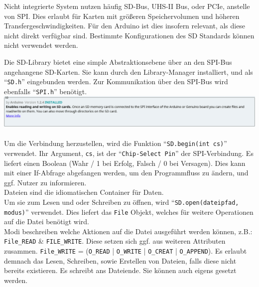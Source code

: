 \documentclass[ngerman]{handout}
\begin{document}
\begin{multicols*}{2}
    Nicht integrierte System nutzen häufig SD-Bus, UHS-II Bus, oder PCIe, anstelle von SPI.
    Dies erlaubt für Karten mit größeren Speichervolumen und höheren Transfergeschwindigkeiten.
    Für den Arduino ist dies insofern relevant, als diese nicht direkt verfügbar sind.
    Bestimmte Konfigurationen des SD Standards können nicht verwendet werden\cite{sd-spec_physical-layer}.

    Die SD-Library bietet eine simple Abstraktionsebene über an den SPI-Bus angehangene SD-Karten.
    Sie kann durch den Library-Manager installiert, und als \enquote{\texttt{SD.h}} eingebunden werden.
    Zur Kommunikation über den SPI-Bus wird ebenfalls \enquote{\texttt{SPI.h}} benötigt.\\

    \includegraphics[width=\linewidth]{media/sd-lib.png}~\\

    Um die Verbindung herzustellen, wird die Funktion \enquote{\texttt{SD.begin(int cs)}} verwendet.
    Ihr Argument, \texttt{cs}, ist der \enquote{\texttt{Chip-Select Pin}} der SPI-Verbindung.
    Es liefert einen Boolean (Wahr / 1 bei Erfolg, Falsch / 0 bei Versagen).
    Dies kann mit einer If-Abfrage abgefangen werden, um den Programmfluss zu ändern, und ggf. Nutzer zu informieren.\\

    Dateien sind die idiomatischen Container für Daten.\\
    Um sie zum Lesen und oder Schreiben zu öffnen, wird \enquote{\texttt{SD.open(dateipfad, modus)}} verwendet.
    Dies liefert das \texttt{File} Objekt, welches für weitere Operationen auf die Datei benötigt wird.\\

    Modi beschreiben welche Aktionen auf die Datei ausgeführt werden können, z.B.: \texttt{File\_READ}
    \& \texttt{FILE\_WRITE}. Diese setzen sich ggf. aus weiteren Attributen zusammen. \texttt{File\_WRITE} = (\texttt{O\_READ} | \texttt{O\_WRITE} | \texttt{O\_CREAT} | \texttt{O\_APPEND}).
    Es erlaubt demnach das Lesen, Schreiben, sowie Erstellen von Dateien, falls diese nicht bereits existieren.
    Es schreibt ans Dateiende. Sie können auch eigens gesetzt werden.


\end{multicols*}
\end{document}
